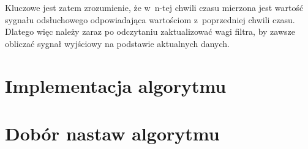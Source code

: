 Kluczowe jest zatem zrozumienie, że w~n-tej chwili czasu mierzona jest wartość sygnału odsłuchowego odpowiadająca wartościom z~poprzedniej chwili czasu. Dlatego więc należy zaraz po odczytaniu zaktualizować wagi filtra, by zawsze obliczać sygnał wyjściowy na podstawie aktualnych danych.
\section{Implementacja algorytmu}

\section{Dobór nastaw algorytmu}
